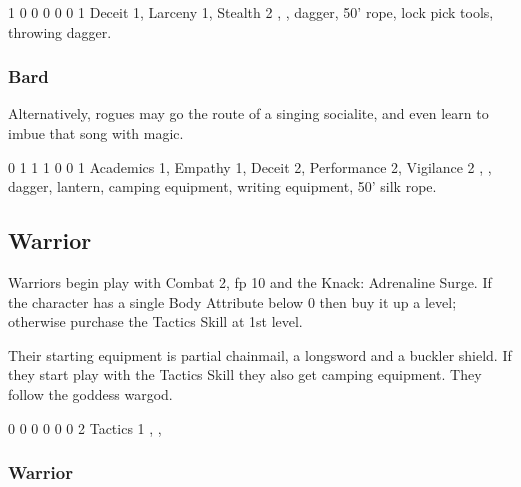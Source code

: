 {\begin{multicols}{2}

{1}%
{0}%
{{0}%
{0}%
{0}}%
{0}%
{1}%
{Deceit 1, Larceny 1, Stealth 2\knacks{\perfectsneakattack}}%
{\longsword, \completeleather, dagger, 50' rope, lock pick tools, throwing dagger.}%
{\addtocounter{fp}{5}}

\subsubsection{Bard}

Alternatively, rogues may go the route of a singing socialite, and even learn to imbue that song with magic.


{0}%
{1}%
{{1}%
{1}%
{0}}%
{0}%
{1}%
{Academics 1, Empathy 1, Deceit 2, Performance 2, Vigilance 2}%
{\longsword, \partialleather, dagger, lantern, camping equipment, writing equipment, 50' silk rope.}%
{\addtocounter{fp}{10}}

\subsection{Warrior}

Warriors begin play with Combat 2, \gls{fp} 10 and the Knack: Adrenaline Surge.
If the character has a single Body Attribute below 0 then buy it up a level; otherwise purchase the Tactics Skill at 1st level.

Their starting equipment is partial chainmail, a longsword and a buckler shield.
If they start play with the Tactics Skill they also get camping equipment.
They follow the goddess \gls{wargod}.


{0}%
{0}%
{{0}%
{0}%
{0}}%
{0}%
{2}%
{Tactics 1\knacks{\adrenalinesurge}}%
{\longsword, \partialchain, \bucklar}%
{\addtocounter{fp}{5}}

\subsubsection{Warrior}


\end{multicols}}
